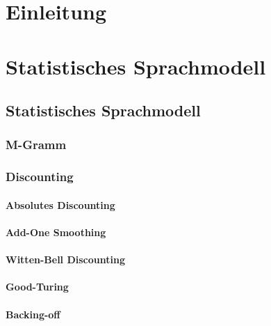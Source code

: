 \chapter{Einleitung}
\label{chapter:Einleitung}
	
	
\chapter{Statistisches Sprachmodell}
\label{chapter:Sprach-Modell}

\section{Statistisches Sprachmodell}
	

	\subsection{M-Gramm}
  	
  
  \subsection{Discounting}
  	
  
  	\subsubsection{Absolutes Discounting}
  			
  	\subsubsection{Add-One Smoothing}
  			
  	\subsubsection{Witten-Bell Discounting}
  		
		\subsubsection{Good-Turing}
			

		
		\subsubsection{Backing-off}
			
		
